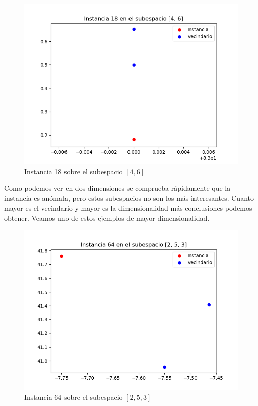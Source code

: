 \begin{figure}[H]
	\centering
	\label{22}
	\includegraphics[scale=0.7]{imagenes/22}
	\caption{Instancia 18 sobre el subespacio $[4,6]$}
\end{figure}

Como podemos ver en dos dimensiones se comprueba rápidamente que la instancia es anómala, pero estos subespacios no son los más interesantes. Cuanto mayor es el vecindario y mayor es la dimensionalidad más conclusiones podemos obtener. Veamos uno de estos ejemplos de mayor dimensionalidad.

\begin{figure}[H]
	\centering
	\label{68_tsne}
	\includegraphics[scale=0.7]{imagenes/68_tsne}
	\caption{Instancia 64 sobre el subespacio $[2,5,3]$}
\end{figure}

